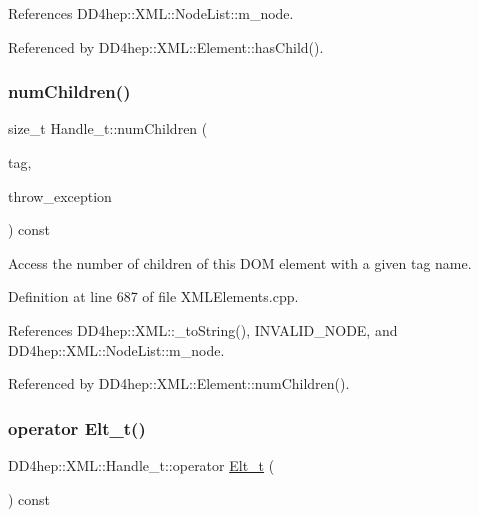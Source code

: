 References D\+D4hep\+::\+X\+M\+L\+::\+Node\+List\+::m\+\_\+node.



Referenced by D\+D4hep\+::\+X\+M\+L\+::\+Element\+::has\+Child().

\hypertarget{class_d_d4hep_1_1_x_m_l_1_1_handle__t_ad9e37cc353a2144b43db84d461cbcf1b}{}\label{class_d_d4hep_1_1_x_m_l_1_1_handle__t_ad9e37cc353a2144b43db84d461cbcf1b} 
\subsubsection{\texorpdfstring{num\+Children()}{numChildren()}}
{\footnotesize\ttfamily size\+\_\+t Handle\+\_\+t\+::num\+Children (\begin{DoxyParamCaption}\item[{const \hyperlink{namespace_d_d4hep_1_1_x_m_l_a09e5d9cc86ed782f6826dfe0778c1815}{Xml\+Char} $\ast$}]{tag,  }\item[{bool}]{throw\+\_\+exception }\end{DoxyParamCaption}) const}



Access the number of children of this D\+OM element with a given tag name. 



Definition at line 687 of file X\+M\+L\+Elements.\+cpp.



References D\+D4hep\+::\+X\+M\+L\+::\+\_\+to\+String(), I\+N\+V\+A\+L\+I\+D\+\_\+\+N\+O\+DE, and D\+D4hep\+::\+X\+M\+L\+::\+Node\+List\+::m\+\_\+node.



Referenced by D\+D4hep\+::\+X\+M\+L\+::\+Element\+::num\+Children().

\hypertarget{class_d_d4hep_1_1_x_m_l_1_1_handle__t_a1e55a5b7b3a8da11999dd1b4cb3d11da}{}\label{class_d_d4hep_1_1_x_m_l_1_1_handle__t_a1e55a5b7b3a8da11999dd1b4cb3d11da} 
\subsubsection{\texorpdfstring{operator Elt\+\_\+t()}{operator Elt\_t()}}
{\footnotesize\ttfamily D\+D4hep\+::\+X\+M\+L\+::\+Handle\+\_\+t\+::operator \hyperlink{class_d_d4hep_1_1_x_m_l_1_1_handle__t_a81a72155f29971b37652430a334a6b30}{Elt\+\_\+t} (\begin{DoxyParamCaption}{ }\end{DoxyParamCaption}) const\hspace{0.3cm}{\ttfamily [inline]}}



